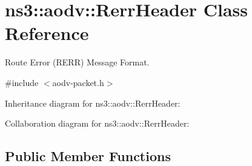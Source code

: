 \hypertarget{classns3_1_1aodv_1_1RerrHeader}{}\section{ns3\+:\+:aodv\+:\+:Rerr\+Header Class Reference}
\label{classns3_1_1aodv_1_1RerrHeader}


Route Error (R\+E\+RR) Message Format.  




{\ttfamily \#include $<$aodv-\/packet.\+h$>$}



Inheritance diagram for ns3\+:\+:aodv\+:\+:Rerr\+Header\+:


Collaboration diagram for ns3\+:\+:aodv\+:\+:Rerr\+Header\+:
\subsection*{Public Member Functions}
